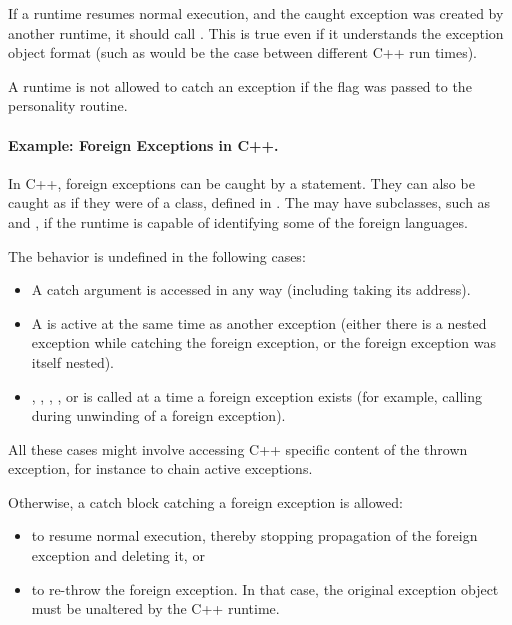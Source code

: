 If a runtime resumes normal execution, and the caught exception was
created by another runtime, it should call .
This is true even if it understands the exception object format
(such as would be the case between different C++ run times).

A runtime is not allowed to catch an exception if the
 flag was passed to the personality routine.

\paragraph{Example: Foreign Exceptions in C++.}
\begin{sloppypar}
In C++, foreign exceptions can be
caught by a  statement. They can also be caught as if they
were of a  class, defined in . The
 may have subclasses, such as
 and , if the runtime is capable
of identifying some of the foreign languages.
\end{sloppypar}

The behavior is undefined in the following cases:
\begin{itemize}
\item A  catch argument is accessed in any way
     (including taking its address).

\item A  is active at the same time as another
     exception (either there is a nested exception while catching the
     foreign exception, or the foreign exception was itself nested).

\item {}, ,
     , , or
      is called at a time a foreign exception
     exists (for example, calling  during
     unwinding of a foreign exception).
\end{itemize}

All these cases might involve accessing C++ specific content of the
thrown exception, for instance to chain active exceptions.

Otherwise, a catch block catching a foreign exception is allowed:
\begin{itemize}
\item to resume normal execution, thereby stopping propagation of
      the foreign exception and deleting it, or
\item to re-throw the foreign exception. In that case, the original
      exception object must be unaltered by the C++ runtime.
\end{itemize}

